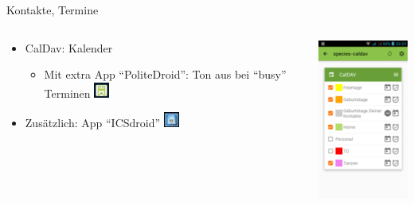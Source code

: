 \documentclass{beamer}
\begin{document}
\begin{frame}{Kontakte, Termine}
\begin{columns}[c]
\begin{column}[T]{.7\textwidth}
    \vspace{-2cm}
      \begin{itemize}
        \item CalDav: Kalender
        \begin{itemize}
          \item Mit extra App "`PoliteDroid"': Ton aus bei "`busy"' Terminen \includegraphics[width=0.5cm]{polite.png}
        \end{itemize}
      \item Zusätzlich: App "`ICSdroid"' \includegraphics[width=0.5cm]{ics.png}
      \end{itemize}
   \end{column}
  \begin{column}[T]{.3\textwidth}
    \vspace{-6.1cm}
    \includegraphics[width=3.5cm]{caldav.png} 
   \end{column}
\end{columns}

\end{frame}
  
   
\end{document}
